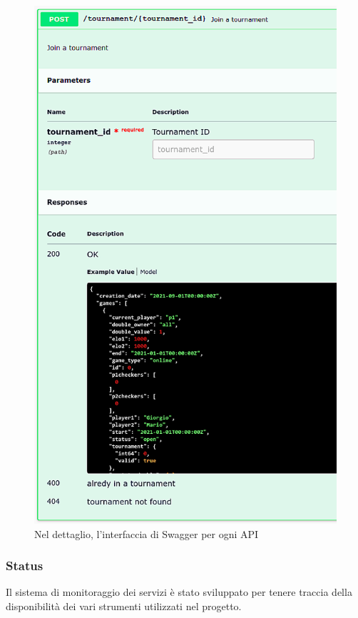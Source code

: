 \documentclass{article}
\begin{document}
\begin{figure}[H]
\begin{minipage}[t]{0.49\textwidth}
        \includegraphics[width=\textwidth]{report-sw_joinTournament}
        \caption{Nel dettaglio, l'interfaccia di Swagger per ogni API}
        \label{fig:sw_joinTournament}
    \end{minipage}    
\end{figure}


\subsubsection{Status}
\label{sec:status}
Il sistema di monitoraggio dei servizi è stato sviluppato per tenere traccia della disponibilità dei vari strumenti 
utilizzati nel progetto.
\end{document}
